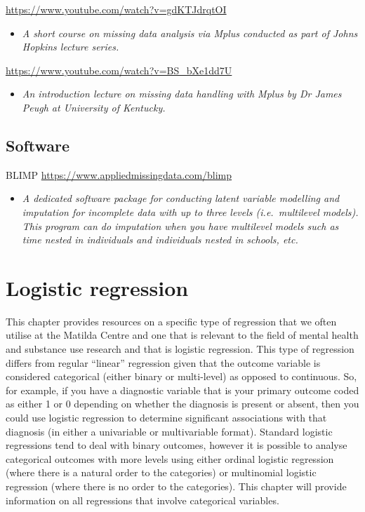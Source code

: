 \documentclass[
]{book}
\providecommand{\tightlist}{%
  \setlength{\itemsep}{0pt}\setlength{\parskip}{0pt}}
\begin{document}
\url{https://www.youtube.com/watch?v=gdKTJdrqtOI}

\begin{itemize}
\tightlist
\item
  \emph{A short course on missing data analysis via Mplus conducted as part of Johns Hopkins lecture series. }
\end{itemize}

\url{https://www.youtube.com/watch?v=BS_bXe1dd7U}

\begin{itemize}
\tightlist
\item
  \emph{An introduction lecture on missing data handling with Mplus by Dr James Peugh at University of Kentucky.}
\end{itemize}

\section{Software}\label{software-1}

BLIMP \url{https://www.appliedmissingdata.com/blimp}

\begin{itemize}
\tightlist
\item
  \emph{A dedicated software package for conducting latent variable modelling and imputation for incomplete data with up to three levels (i.e.~multilevel models). This program can do imputation when you have multilevel models such as time nested in individuals and individuals nested in schools, etc. }
\end{itemize}

\chapter{Logistic regression}\label{logistic-regression}

This chapter provides resources on a specific type of regression that we often utilise at the Matilda Centre and one that is relevant to the field of mental health and substance use research and that is logistic regression. This type of regression differs from regular ``linear'' regression given that the outcome variable is considered categorical (either binary or multi-level) as opposed to continuous. So, for example, if you have a diagnostic variable that is your primary outcome coded as either 1 or 0 depending on whether the diagnosis is present or absent, then you could use logistic regression to determine significant associations with that diagnosis (in either a univariable or multivariable format). Standard logistic regressions tend to deal with binary outcomes, however it is possible to analyse categorical outcomes with more levels using either ordinal logistic regression (where there is a natural order to the categories) or multinomial logistic regression (where there is no order to the categories). This chapter will provide information on all regressions that involve categorical variables.
\end{document}
